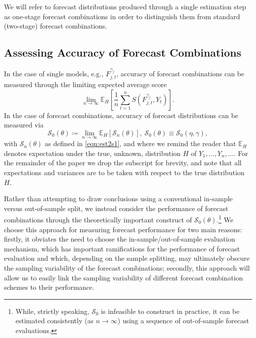 \documentclass[12pt]{article}
\theoremstyle{definition}
\theoremstyle{remark}
\begin{document}
{We will refer to forecast distributions produced through a single estimation step as one-stage forecast combinations in order to distinguish them from standard (two-stage) forecast combinations.

\subsection{Assessing Accuracy of Forecast Combinations\label{subsec:assess}}

In the case of single models, e.g., $F_{j,t}^{\gamma _{j}}$, accuracy of forecast combinations can be measured through the limiting expected average score 
\begin{equation}
\lim_{n\rightarrow \infty }\mathbb{E}_{H}\left[ \frac{1}{n} \sum_{t=1}^{n}S(F_{j,t}^{\gamma _{j}},Y_{t})\right].  \label{eqn:indiv}
\end{equation}
In the case of forecast combinations, accuracy of forecast distributions can be measured via 
\begin{equation}
\mathcal{S}_{0}(\theta) \coloneqq \lim_{n\rightarrow \infty} \mathbb{E}_{H} \left[ \mathcal{S}_{n}(\theta) \right],\ \mathcal{S}_{0}(\theta) \equiv \mathcal{S}_{0}(\eta, \gamma),  \label{eqn:S0}
\end{equation}
with $\mathcal{S}_{n}(\theta )$ as defined in \eqref{eqn:est2s1}, and where we remind the reader that $\mathbb{E}_{H}$ denotes expectation under the true, unknown, distribution $H$ of $Y_{1}, \dots, Y_{n}, \dots$. For the remainder of the paper we drop the subscript for brevity, and note that all expectations and variances are to be taken with respect to the true distribution $H$.

Rather than attempting to draw conclusions using a conventional in-sample versus out-of-sample split, we instead consider the performance of forecast combinations through the theoretically important construct of $\mathcal{S}_{0}(\theta)$.\footnote{While, strictly speaking, $\mathcal{S}_{0}$ is infeasible to construct in practice, it can be estimated consistently (as $n \rightarrow \infty $) using a sequence of out-of-sample forecast evaluations.} We choose this approach for measuring forecast performance for two main reasons: firstly, it obviates the need to choose the {in-sample/out-of-sample} evaluation mechanism, which has important ramifications for the performance of forecast evaluation and {which}, depending on the sample splitting, may ultimately obscure the sampling variability of the forecast combinations; secondly, this approach will allow us to easily link the sampling variability of different forecast combination schemes to their performance.

}
\end{document}
